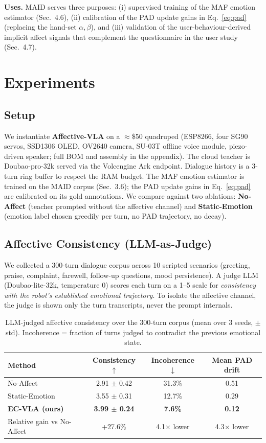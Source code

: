 \documentclass{article}
\newcommand{\method}{\textbf{Affective-VLA}}
\theoremstyle{definition}
\begin{document}
\textbf{Uses.} MAID serves three purposes: (i) supervised training of the MAF
emotion estimator (Sec.~4.6), (ii) calibration of the PAD update gains in
Eq.~\eqref{eq:pad} (replacing the hand-set $\alpha,\beta$), and (iii) validation
of the user-behaviour-derived implicit affect signals that complement the
questionnaire in the user study (Sec.~4.7).

\section{Experiments}

\subsection{Setup}
We instantiate \method{} on a $\approx$\$50 quadruped (ESP8266, four SG90 servos,
SSD1306 OLED, OV2640 camera, SU-03T offline voice module, piezo-driven speaker;
full BOM and assembly in the appendix). The cloud teacher is Doubao-pro-32k
served via the Volcengine Ark endpoint. Dialogue history is a 3-turn ring buffer
to respect the RAM budget. The MAF emotion estimator is trained on the MAID
corpus (Sec.~3.6); the PAD update gains in Eq.~\eqref{eq:pad} are calibrated on
its gold annotations. We compare against two ablations: \textbf{No-Affect}
(teacher prompted without the affective channel) and \textbf{Static-Emotion}
(emotion label chosen greedily per turn, no PAD trajectory, no decay).

\subsection{Affective Consistency (LLM-as-Judge)}

We collected a 300-turn dialogue corpus across 10 scripted scenarios
(greeting, praise, complaint, farewell, follow-up questions, mood persistence).
A judge LLM (Doubao-lite-32k, temperature 0) scores each turn on a 1--5 scale for
\emph{consistency with the robot's established emotional trajectory}. To isolate
the affective channel, the judge is shown only the turn transcripts, never the
prompt internals.

\begin{table}[t]
\centering
\small
\begin{tabular}{lccc}
\toprule
\textbf{Method} & \textbf{Consistency $\uparrow$} & \textbf{Incoherence $\downarrow$} & \textbf{Mean PAD drift} \\
\midrule
No-Affect        & 2.91 $\pm$ 0.42 & 31.3\% & 0.51 \\
Static-Emotion   & 3.55 $\pm$ 0.31 & 12.7\% & 0.29 \\
\textbf{EC-VLA (ours)} & \textbf{3.99 $\pm$ 0.24} & \textbf{7.6\%} & \textbf{0.12} \\
\midrule
Relative gain vs No-Affect & +27.6\% & 4.1$\times$ lower & 4.3$\times$ lower \\
\bottomrule
\end{tabular}
\caption{LLM-judged affective consistency over the 300-turn corpus (mean over
3 seeds, $\pm$ std). Incoherence = fraction of turns judged to contradict the
previous emotional state.}
\label{tab:consistency}
\end{table}
\end{document}

